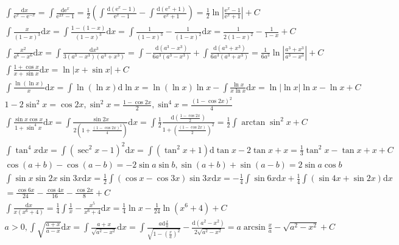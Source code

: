 \documentclass{article}
\begin{document}
\clearpage 
\begin{align*}
    \int \frac{\mathrm{d}x}{\mathrm{e}^x - \mathrm{e}^{-x} } = \int \frac{\mathrm{d}\mathrm{e}^x}{\mathrm{e}^{2x}-1} = \frac{1}{2} \left(\int \frac{\mathrm{d}(\mathrm{e}^x-1)}{\mathrm{e}^x-1} - \int \frac{\mathrm{d}(\mathrm{e}^x+1)}{\mathrm{e}^x+1} \right) = \frac{1}{2}\ln \left|\frac{\mathrm{e}^x-1}{\mathrm{e}^x+1}\right|+C\\
    \int \frac{x}{(1-x)^3}\mathrm{d}x = \int \frac{1-(1-x)}{(1-x)^3}\mathrm{d}x = \int \frac{1}{(1-x)^3} - \frac{1}{(1-x)^2} \mathrm{d}x = \frac{1}{2(1-x)^2} - \frac{1}{1-x} + C \\ 
    \int \frac{x^2}{a^6 - x^6} \mathrm{d}x = \int \frac{\mathrm{d}x^3}{3(a^3-x^3)(a^3+x^3)} = \int -\frac{\mathrm{d}(a^3-x^3)}{6a^3(a^3-x^3)} + \int \frac{\mathrm{d}(a^3+x^3)}{6a^3(a^3+x^3)} = \frac{1}{6a^3} \ln\left|\frac{a^3+x^3}{a^3-x^3}\right| + C \\ 
    \int \frac{1+\cos x}{x+\sin x}\mathrm{d}x = \ln|x+\sin x| + C \\ 
    \int \frac{\ln(\ln x)}{x} \mathrm{d} x = \int \ln(\ln x) \mathrm{d}\ln x = \ln(\ln x) \ln x - \int \frac{\ln x}{x\ln x}\mathrm{d} x = \ln |\ln x | \ln x - \ln x + C \\
    1-2\sin^2 x = \cos 2x , \sin^2 x = \frac{1-\cos 2x}{2}, \sin^4 x = \frac{(1-\cos 2x)^2}{4}\\ 
    \int \frac{\sin x \cos x}{1+\sin^4 x} \mathrm{d}x = \int \frac{\sin 2x}{2(1+\frac{(1-\cos 2x)^2}{4})} \mathrm{d}x = \int \frac{1}{2} \frac{\mathrm{d}(\frac{1-\cos 2x}{2})}{1+\left(\frac{(1-\cos 2x)}{2}\right)^2} = \frac{1}{2}\int \arctan \sin^2 x + C \\
    \int \tan^4 x \mathrm{d}x = \int (\sec^2 x - 1)^2 \mathrm{d}x  = \int (\tan^2 x+1) \mathrm{d} \tan x - 2\tan x + x = \frac{1}{3}\tan^2 x - \tan x + x + C \\
    \cos(a+b) - \cos(a-b) = -2\sin a \sin b , \sin(a+b) + \sin(a-b) = 2\sin a \cos b \\
    \int \sin x \sin 2x \sin 3x\mathrm{d}x = \frac{1}{2} \int ( \cos x - \cos 3x) \sin 3x \mathrm{d}x = - \frac{1}{4}\int \sin 6x \mathrm{d}x + \frac{1}{4} \int (\sin 4x + \sin 2x) \mathrm{d}x \\ 
    = \frac{\cos 6x}{24} - \frac{\cos 4x}{16} - \frac{\cos 2x}{8} + C \\  
    \int \frac{\mathrm{d}x}{x(x^6+4)} = \frac{1}{4} \int \frac{1}{x} - \frac{x^5}{x^6+4} \mathrm{d}x = \frac{1}{4}\ln x - \frac{1}{24} \ln(x^6+4) + C \\ 
    a>0 , \int \sqrt{\frac{a+x}{a-x}}\mathrm{d}x = \int \frac{a+x}{\sqrt{a^2-x^2}}\mathrm{d}x = \int\frac{a\mathrm{d}\frac{x}{a}}{\sqrt{1-\left(\frac{x}{a}\right)^2}} - \frac{\mathrm{d}(a^2-x^2)}{2\sqrt{a^2-x^2}} = a\arcsin \frac{x}{a} - \sqrt{a^2-x^2} + C \\
\end{align*}
\end{document}
